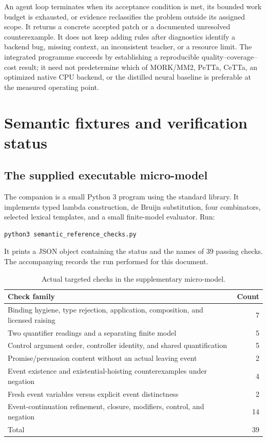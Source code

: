 \documentclass[11pt,a4paper]{article}
\begin{document}
An agent loop terminates when its acceptance condition is met, its bounded work budget is exhausted, or evidence reclassifies the problem outside its assigned scope. It returns a concrete accepted patch or a documented unresolved counterexample. It does not keep adding rules after diagnostics identify a backend bug, missing context, an inconsistent teacher, or a resource limit. The integrated programme succeeds by establishing a reproducible quality--coverage--cost result; it need not predetermine which of MORK/MM2, PeTTa, CeTTa, an optimized native CPU backend, or the distilled neural baseline is preferable at the measured operating point.

\clearpage
\section{Semantic fixtures and verification status}\label{app:verification}

\subsection{The supplied executable micro-model}
The companion  is a small Python 3
program using the standard library. It implements typed lambda construction,
de Bruijn substitution, four combinators, selected lexical templates, and a
small finite-model evaluator. Run:
\begin{lstlisting}
python3 semantic_reference_checks.py
\end{lstlisting}
It prints a JSON object containing the status and the names of 39 passing
checks. The accompanying  records the run
performed for this document.

\begin{table}[htbp]
\small
\begin{tabularx}{\textwidth}{Yr}
\toprule
Check family & Count \\
\midrule
Binding hygiene, type rejection, application, composition, and licensed raising & 7 \\
Two quantifier readings and a separating finite model & 5 \\
Control argument order, controller identity, and shared quantification & 5 \\
Promise/persuasion content without an actual leaving event & 2 \\
Event existence and existential-hoisting counterexamples under negation & 4 \\
Fresh event variables versus explicit event distinctness & 2 \\
Event-continuation refinement, closure, modifiers, control, and negation & 14 \\
\midrule
Total & 39 \\
\bottomrule
\end{tabularx}
\caption{Actual targeted checks in the supplementary micro-model.}
\end{table}
\end{document}
